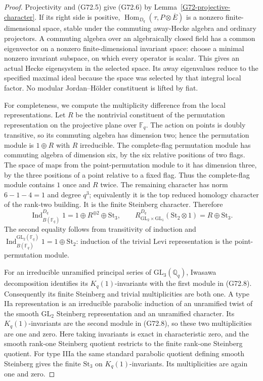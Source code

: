 \begin{proof}
Projectivity and (G72.5) give (G72.6) by
Lemma~\ref{G72-projective-character}.  If its right side is positive,
\(\operatorname{Hom}_{D_q}(\tau,P\otimes\overline E)\)
is a nonzero finite-dimensional space, stable under the commuting
away-Hecke algebra and ordinary projectors.  A commuting algebra
over an algebraically closed field has a common eigenvector on
a nonzero finite-dimensional invariant space: choose a minimal
nonzero invariant subspace, on which every operator is scalar.
This gives an actual Hecke eigensystem in the selected space.
Its away eigenvalues reduce to the specified maximal ideal
because the space was selected by that integral local factor.
No modular Jordan--H\"older constituent is lifted by fiat.

For completeness, we compute the multiplicity difference from
the local representations.  Let \(R\) be the nontrivial
constituent of the permutation representation on the projective
plane over \(\mathbb F_q\).  The action on points is doubly
transitive, so its commuting algebra has dimension two; hence
the permutation module is \(1\oplus R\) with \(R\)
irreducible.  The complete-flag permutation module has commuting
algebra of dimension six, by the six relative positions of
two flags.  The space of maps from the point-permutation module
to it has dimension three, by the three positions of a point
relative to a fixed flag.  Thus the complete-flag module contains
\(1\) once and \(R\) twice.  The remaining character has
norm \(6-1-4=1\) and degree \(q^3\); equivalently it is
the top reduced homology character of the rank-two building.
It is the finite Steinberg character.  Therefore
\[
 \operatorname{Ind}_{B(\mathbb F_q)}^{D_q}1
       =1\oplus R^{\oplus2}\oplus\mathrm{St}_3,
 \qquad
 R_{\mathrm{GL}_2\times\mathrm{GL}_1}^{D_q}
       (\mathrm{St}_2\otimes1)=R\oplus\mathrm{St}_3.
 \tag{G72.8}
\]
The second equality follows from transitivity of induction and
\(\operatorname{Ind}_{B(\mathbb F_q)}^{\mathrm{GL}_2(\mathbb F_q)}1
=1\oplus\mathrm{St}_2\): induction of the trivial Levi
representation is the point-permutation module.

For an irreducible unramified principal series of
\(\mathrm{GL}_3(\mathbb Q_q)\), Iwasawa decomposition identifies
its \(K_q(1)\)-invariants with the first module in (G72.8).
Consequently its finite Steinberg and trivial multiplicities
are both one.  A type IIa representation is an irreducible
parabolic induction of an unramified twist of the smooth
\(\mathrm{GL}_2\) Steinberg representation and an unramified
character.  Its \(K_q(1)\)-invariants are the second module
in (G72.8), so these two multiplicities are one and zero.
Here taking invariants is exact in characteristic zero, and
the smooth rank-one Steinberg quotient restricts to the finite
rank-one Steinberg quotient.  For type IIIa the same standard
parabolic quotient defining smooth Steinberg gives the finite
\(\mathrm{St}_3\) on \(K_q(1)\)-invariants.  Its
multiplicities are again one and zero.


\end{proof}
